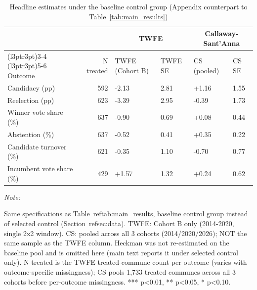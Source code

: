 \begin{table}[!h]
\centering
\caption{\label{tab:baseline_results}Headline estimates under the baseline control group (Appendix counterpart to Table~\ref{tab:main_results})}
\centering
\fontsize{9}{11}\selectfont
\begin{threeparttable}
\begin{tabular}[t]{lrllll}
\toprule
\multicolumn{2}{c}{ } & \multicolumn{2}{c}{TWFE} & \multicolumn{2}{c}{Callaway-Sant'Anna} \\
\cmidrule(l{3pt}r{3pt}){3-4} \cmidrule(l{3pt}r{3pt}){5-6}
Outcome & N treated & TWFE (Cohort B) & TWFE SE & CS (pooled) & CS SE\\
\midrule
Candidacy (pp) & 592 & -2.13 & 2.81 & +1.16 & 1.55\\
Reelection (pp) & 623 & -3.39 & 2.95 & -0.39 & 1.73\\
Winner vote share (\%) & 637 & -0.90 & 0.69 & +0.08 & 0.44\\
Abstention (\%) & 637 & -0.52 & 0.41 & +0.35 & 0.22\\
Candidate turnover (\%) & 621 & -0.35 & 1.10 & -0.70 & 0.77\\
Incumbent vote share (\%) & 429 & +1.57 & 1.32 & +0.24 & 0.62\\
\bottomrule
\end{tabular}
\begin{tablenotes}
\item \textit{Note: } 
\item Same specifications as Table~ref{tab:main_results}, baseline control group instead of selected control (Section~ref{sec:data}). TWFE: Cohort B only (2014-2020, single 2x2 window). CS: pooled across all 3 cohorts (2014/2020/2026); NOT the same sample as the TWFE column. Heckman was not re-estimated on the baseline pool and is omitted here (main text reports it under selected control only). N treated is the TWFE treated-commune count per outcome (varies with outcome-specific missingness); CS pools 1,733 treated communes across all 3 cohorts before per-outcome missingness. *** p<0.01, ** p<0.05, * p<0.10.
\end{tablenotes}
\end{threeparttable}
\end{table}
